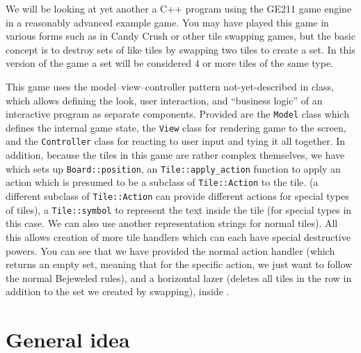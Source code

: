 \documentclass{tufte-handout}
\begin{document}
\maketitle

We will be looking at yet another a C++ program using the GE211 game
engine in a reasonably advanced example game. You may have played this game
in various forms such as in Candy Crush or other tile swapping games, but the
basic concept is to destroy sets of like tiles by swapping two tiles to
create a set. In this version of the game a set will be considered 4 or more
tiles of the same type.

This game uses the model--view--controller pattern not-yet-described in
class, which allows defining the look, user interaction, and ``business
logic'' of an interactive program as separate components. Provided are
the \texttt{Model} class which defines the internal game state, the
\texttt{View} class for rendering game to the screen, and the
\texttt{Controller} class for reacting to user input and tying it all
together. In addition, because the tiles in this game are rather complex
themselves, we have  which sets up
\texttt{Board::position},  an \texttt{Tile::apply_action} function to
apply an action which is presumed to be a subclass of
\texttt{Tile::Action} to the tile. (a different subclass of
\texttt{Tile::Action} can provide different actions for special types of
tiles), a \texttt{Tile::symbol} to represent the text inside the tile
(for special types in this case. We can also use another representation
strings for normal tiles). All this allows creation of more tile
handlers which can each have special destructive powers. You can see
that we have provided the normal action handler (which returns an empty
set, meaning that for the specific action, we just want to follow the
normal Bejeweled rules), and a horizontal lazer (deletes all tiles in
the row in addition to the set we created by swapping), inside
.

\CxxPrelims

\section{General idea}
\end{document}
